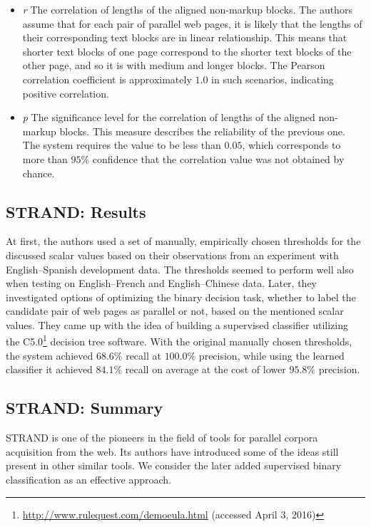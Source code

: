 \begin{enumerate}
\begin{itemize}
		\item \textit{r} \quad The correlation of lengths of the aligned non-markup blocks. The authors assume that for each pair of parallel web pages, it is likely that the lengths of their corresponding text blocks are in linear relationship. This means that shorter text blocks of one page correspond to the shorter text blocks of the other page, and so it is with medium and longer blocks. The Pearson~\cite{Pearson95} correlation coefficient is approximately $1.0$ in such scenarios, indicating positive correlation.
		 
		\item \textit{p} \quad The significance level for the correlation of lengths of the aligned non-markup blocks. This measure describes the reliability of the previous one. The system requires the value to be less than $0.05$, which corresponds to more than $95\%$ confidence that the correlation value was not obtained by chance.
	\end{itemize}
\end{enumerate}

\subsection{STRAND: Results}
\label{subsection:strand_results}

At first, the authors used a set of manually, empirically chosen thresholds for the discussed scalar values based on their observations from an experiment with English--Spanish development data. The thresholds seemed to perform well also when testing on English--French and English--Chinese data. Later, they investigated options of optimizing the binary decision task, whether to label the candidate pair of web pages as parallel or not, based on the mentioned scalar values. They came up with the idea of building a supervised classifier utilizing the C5.0\footnote{\url{http://www.rulequest.com/demoeula.html} (accessed April 3, 2016)} decision tree software. With the original manually chosen thresholds, the system achieved $68.6\%$ recall at $100.0\%$ precision, while using the learned classifier it achieved $84.1\%$ recall on average at the cost of lower $95.8\%$ precision.

\subsection{STRAND: Summary}
\label{subsection:strand_summary}
	
STRAND is one of the pioneers in the field of tools for parallel corpora acquisition from the web. Its authors have introduced some of the ideas still present in other similar tools. We consider the later added supervised binary classification as an effective approach.


